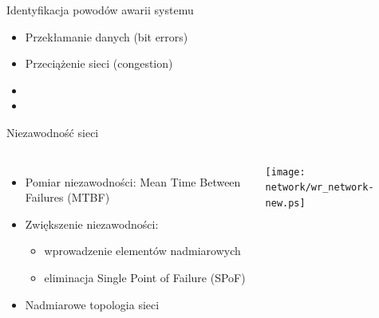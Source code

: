 \documentclass[compress,red]{beamer}
\begin{document}
\begin{frame}{Identyfikacja powodów awarii systemu}


  \begin{itemize}
    \item Przekłamanie danych (bit errors)
    \item Przeciążenie sieci (congestion)
    \item {}
    \item \color{black}{Zbyt długi czas transmisji (exceeding upper bound latency)}
  \end{itemize}

\end{frame}
\begin{frame}{Niezawodność sieci}


  \begin{columns}[c]

  \begin{itemize}
    \item Pomiar niezawodności: Mean Time Between Failures (MTBF)
    \item Zwiększenie niezawodności:
    \begin{itemize}
      \item wprowadzenie elementów nadmiarowych
      \item eliminacja Single Point of Failure (SPoF)
    \end{itemize}
    \item Nadmiarowe topologia sieci
  \end{itemize}

      \vspace{2cm}


      \begin{center}
      \texttt{[image: network/wr\_network-new.ps]}
      \end{center}

      \vspace{2cm}

  \end{columns}

\end{frame}
\end{document}
